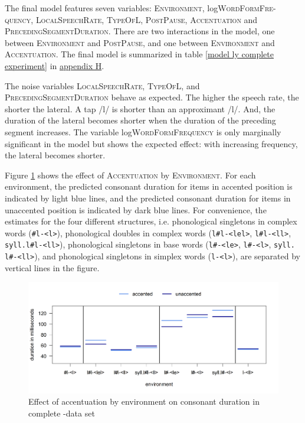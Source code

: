 The final model features seven variables: \textsc{Environment}, log\textsc{WordFormFre-quency},  \textsc{LocalSpeechRate}, \textsc{TypeOfL}, \textsc{PostPause}, \textsc{Accentuation} and \textsc{PrecedingSegmentDuration}. 
There are two interactions in the model, one between \textsc{Environment} and \textsc{PostPause}, and one between \textsc{Environment} and \textsc{Accentuation}. The final model is summarized in table \ref{model ly complete experiment} in \hyperref[Appendix H: Model Summaries Experiment]{appendix H}.


The noise variables \textsc{LocalSpeechRate}, \textsc{TypeOfL}, and \textsc{PrecedingSegmentDuration} behave as expected. The higher the speech rate, the shorter the lateral. A tap /l/ is shorter than an approximant /l/. And, the duration of the lateral becomes shorter when the duration of the preceding segment increases.
The variable log\textsc{WordFormFrequency} is only marginally significant in the model but shows the expected effect: with increasing frequency, the lateral becomes shorter. 


Figure \ref{fig:Env Acc ly Complete experiment} shows the effect of \textsc{Accentuation} by \textsc{Environment}. For each environment, the predicted consonant duration for items in accented position is indicated by light blue lines, and the predicted consonant duration for  items in unaccented position is indicated by dark blue lines.
 For convenience, the estimates for the four different structures, i.e. phonological singletons in complex words (\texttt{\#l-<l>}), phonological doubles in complex words  (\texttt{l\#l-<lel>}, \texttt{l\#l-<ll>}, \texttt{syll.l\#l-<ll>}), phonological singletons in base words (\texttt{l\#-<le>}, \texttt{l\#-<l>}, \texttt{syll. l\#-<ll>}), and phonological singletons in simplex words (\texttt{l-<l>}), are separated by vertical lines in the figure. 


\begin{figure} [h!]
	\centering

	\includegraphics [scale=0.48] {images/Experiment/LyModelCompleteInterEnvAccLines}

	\caption{Effect of accentuation by environment on consonant duration in complete -data set}
	\label{fig:Env Acc ly Complete experiment}

\end{figure}




